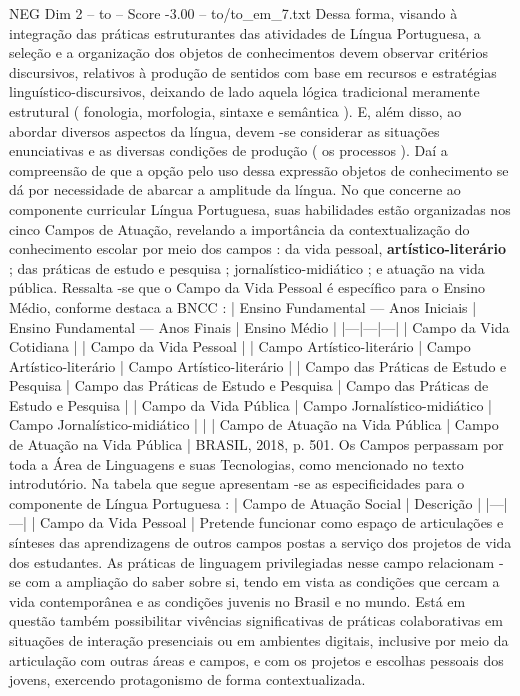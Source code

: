 \begin{textsample}{NEG Dim 2 – to – Score -3.00 – to/to\_em\_7.txt}
Dessa forma, visando à integração das práticas estruturantes das atividades de Língua Portuguesa, a seleção e a organização dos objetos de conhecimentos devem observar critérios discursivos, relativos à produção de sentidos com base em recursos e estratégias linguístico-discursivos, deixando de lado aquela lógica tradicional meramente estrutural ( fonologia, morfologia, sintaxe e semântica ).
E, além disso, ao abordar diversos aspectos da língua, devem -se considerar as situações enunciativas e as diversas condições de produção ( os processos ).
Daí a compreensão de que a opção pelo uso dessa expressão objetos de conhecimento se dá por necessidade de abarcar a amplitude da língua.
No que concerne ao componente curricular Língua Portuguesa, suas habilidades estão organizadas nos cinco Campos de Atuação, revelando a importância da contextualização do conhecimento escolar por meio dos campos : da vida pessoal, \textbf{artístico-literário} ; das práticas de estudo e pesquisa ; jornalístico-midiático ; e atuação na vida pública.
Ressalta -se que o Campo da Vida Pessoal é específico para o Ensino Médio, conforme destaca a BNCC : | Ensino Fundamental — Anos Iniciais | Ensino Fundamental — Anos Finais | Ensino Médio | |---|---|---| | Campo da Vida Cotidiana | | Campo da Vida Pessoal | | Campo Artístico-literário | Campo Artístico-literário | Campo Artístico-literário | | Campo das Práticas de Estudo e Pesquisa | Campo das Práticas de Estudo e Pesquisa | Campo das Práticas de Estudo e Pesquisa | | Campo da Vida Pública | Campo Jornalístico-midiático | Campo Jornalístico-midiático | | | Campo de Atuação na Vida Pública | Campo de Atuação na Vida Pública | BRASIL, 2018, p. 501.
Os Campos perpassam por toda a Área de Linguagens e suas Tecnologias, como mencionado no texto introdutório.
Na tabela que segue apresentam -se as especificidades para o componente de Língua Portuguesa : | Campo de Atuação Social | Descrição | |---|---| | Campo da Vida Pessoal | Pretende funcionar como espaço de articulações e sínteses das aprendizagens de outros campos postas a serviço dos projetos de vida dos estudantes.
As práticas de linguagem privilegiadas nesse campo relacionam -se com a ampliação do saber sobre si, tendo em vista as condições que cercam a vida contemporânea e as condições juvenis no Brasil e no mundo.
Está em questão também possibilitar vivências significativas de práticas colaborativas em situações de interação presenciais ou em ambientes digitais, inclusive por meio da articulação com outras áreas e campos, e com os projetos e escolhas pessoais dos jovens, exercendo protagonismo de forma contextualizada.

\end{textsample}
